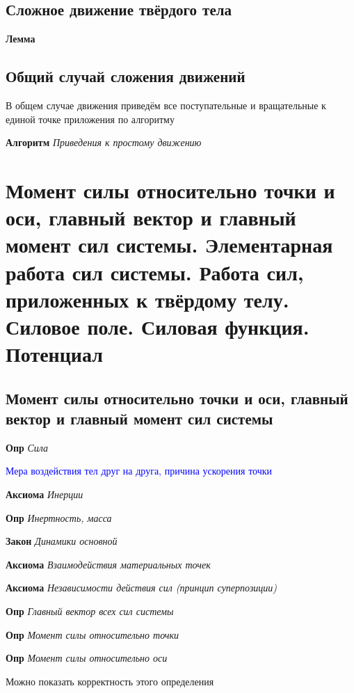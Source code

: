 \documentclass[a4paper, 14pt]{article}
\begin{document}
    \subsection{Сложное движение твёрдого тела}
    
    \textbf{Лемма}
    
    \subsection{Общий случай сложения движений}
    
    В общем случае движения приведём все поступательные и вращательные к единой точке приложения по алгоритму
    
    \textbf{Алгоритм} \textit{Приведения к простому движению}
    
    \section{Момент силы относительно точки и оси, главный вектор и главный момент сил системы.
    Элементарная работа сил системы.
    Работа сил, приложенных к твёрдому телу.
    Силовое поле.
    Силовая функция.
    Потенциал}
    
    \subsection{Момент силы относительно точки и оси, главный вектор и главный момент сил системы}
    
    \textbf{Опр} \textit{Сила}
    
    \textcolor{blue}{Мера воздействия тел друг на друга, причина ускорения точки}
    
    \textbf{Аксиома} \textit{Инерции}
    
    \textbf{Опр} \textit{Инертность, масса}
    
    \textbf{Закон} \textit{Динамики основной}
    
    \textbf{Аксиома} \textit{Взаимодействия материальных точек}
    
    \textbf{Аксиома} \textit{Независимости действия сил (принцип суперпозиции)}
    
    \textbf{Опр} \textit{Главный вектор всех сил системы}
    
    \textbf{Опр} \textit{Момент силы относительно точки}
    
    \textbf{Опр} \textit{Момент силы относительно оси}
    
    Можно показать корректность этого определения
    
\end{document}
